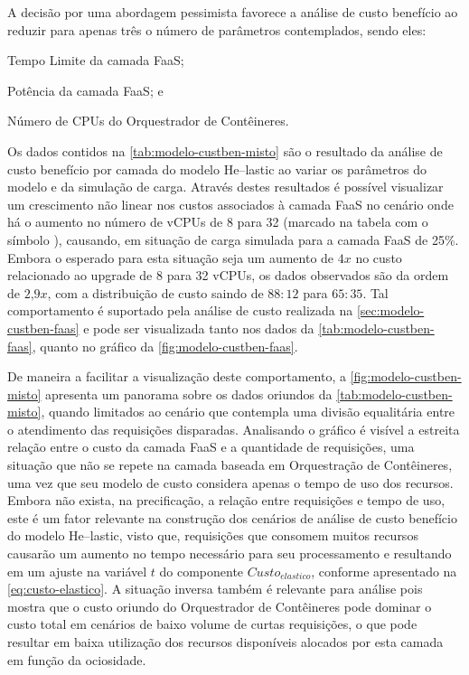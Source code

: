 \documentclass[english,brazilian]{UNISINOSmonografia} %
\begin{document}
A decisão por uma abordagem pessimista favorece a análise de custo benefício ao reduzir para apenas três o número de parâmetros contemplados, sendo eles: 
\begin{inparaenum}[(i)]
	\item Tempo Limite da camada FaaS;
	\item Potência da camada FaaS; e
	\item Número de CPUs do Orquestrador de Contêineres.
\end{inparaenum}
Os dados contidos na \autoref{tab:modelo-custben-misto} são o resultado da análise de custo benefício por camada do modelo \textsf{He}--lastic ao variar os parâmetros do modelo e da simulação de carga.
Através destes resultados é possível visualizar um crescimento não linear nos custos associados à camada FaaS no cenário onde há o aumento no número de vCPUs de 8 para 32 (marcado na tabela com o símbolo \dag), causando, em situação de carga simulada para a camada FaaS de 25\%.
Embora o esperado para esta situação seja um aumento de $4x$ no custo relacionado ao upgrade de 8 para 32 vCPUs, os dados observados são da ordem de $2\text{,}9x$, com a distribuição de custo saindo de $88:12$ para $65:35$.
Tal comportamento é suportado pela análise de custo realizada na \autoref{sec:modelo-custben-faas} e pode ser visualizada tanto nos dados da \autoref{tab:modelo-custben-faas}, quanto no gráfico da \autoref{fig:modelo-custben-faas}.



De maneira a facilitar a visualização deste comportamento, a \autoref{fig:modelo-custben-misto} apresenta um panorama sobre os dados oriundos da \autoref{tab:modelo-custben-misto}, quando limitados ao cenário que contempla uma divisão equalitária entre o atendimento das requisições disparadas.
Analisando o gráfico é visível a estreita relação entre o custo da camada FaaS e a quantidade de requisições, uma situação que não se repete na camada baseada em Orquestração de Contêineres, uma vez que seu modelo de custo considera apenas o tempo de uso dos recursos.
Embora não exista, na precificação, a relação entre requisições e tempo de uso, este é um fator relevante na construção dos cenários de análise de custo benefício do modelo \textsf{He}--lastic, visto que, requisições que consomem muitos recursos causarão um aumento no tempo necessário para seu processamento e resultando em um ajuste na variável $t$ do componente $Custo_{elastico}$, conforme apresentado na \autoref{eq:custo-elastico}.
A situação inversa também é relevante para análise pois mostra que o custo oriundo do Orquestrador de Contêineres pode dominar o custo total em cenários de baixo volume de curtas requisições, o que pode resultar em baixa utilização dos recursos disponíveis alocados por esta camada em função da ociosidade.
\end{document}
